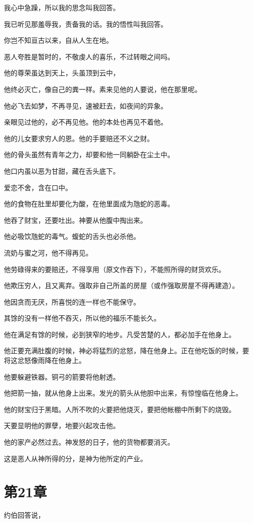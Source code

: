 \documentclass[12pt,oneside]{book}
\begin{document}
我心中急躁，所以我的思念叫我回答。

我已听见那羞辱我，责备我的话。我的悟性叫我回答。

你岂不知亘古以来，自从人生在地。

恶人夸胜是暂时的，不敬虔人的喜乐，不过转眼之间吗。

他的尊荣虽达到天上，头虽顶到云中，

他终必灭亡，像自己的粪一样。素来见他的人要说，他在那里呢。

他必飞去如梦，不再寻见，速被赶去，如夜间的异象。

亲眼见过他的，必不再见他。他的本处也再见不着他。

他的儿女要求穷人的恩。他的手要赔还不义之财。

他的骨头虽然有青年之力，却要和他一同躺卧在尘土中。

他口内虽以恶为甘甜，藏在舌头底下。

爱恋不舍，含在口中。

他的食物在肚里却要化为酸，在他里面成为虺蛇的恶毒。

他吞了财宝，还要吐出。神要从他腹中掏出来。

他必吸饮虺蛇的毒气。蝮蛇的舌头也必杀他。

流奶与蜜之河，他不得再见。

他劳碌得来的要赔还，不得享用（原文作吞下），不能照所得的财货欢乐。

他欺压穷人，且又离弃。强取非自己所盖的房屋（或作强取房屋不得再建造）。

他因贪而无厌，所喜悦的连一样也不能保守。

其馀的没有一样他不吞灭，所以他的福乐不能长久。

他在满足有馀的时候，必到狭窄的地步。凡受苦楚的人，都必加手在他身上。

他正要充满肚腹的时候，神必将猛烈的忿怒，降在他身上。正在他吃饭的时候，要将这忿怒像雨降在他身上。

他要躲避铁器。铜弓的箭要将他射透。

他把箭一抽，就从他身上出来。发光的箭头从他胆中出来，有惊惶临在他身上。

他的财宝归于黑暗。人所不吹的火要把他烧灭，要把他帐棚中所剩下的烧毁。

天要显明他的罪孽，地要兴起攻击他。

他的家产必然过去。神发怒的日子，他的货物都要消灭。

这是恶人从神所得的分，是神为他所定的产业。


\chapter{第21章}
约伯回答说，
\end{document}
